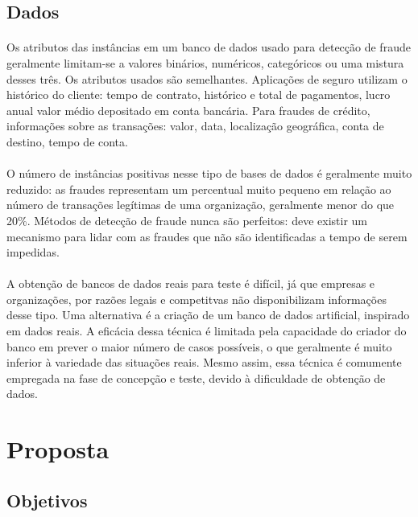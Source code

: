 \documentclass{iiufrgs}
\begin{document}
\subsection{Dados}

\paragraph{}Os atributos das instâncias em um banco de dados usado para detecção de fraude geralmente limitam-se a valores binários, numéricos, categóricos ou uma mistura desses três. Os atributos usados são semelhantes. Aplicações de seguro utilizam o histórico do cliente: tempo de contrato, histórico e total de pagamentos, lucro anual valor médio depositado em conta bancária. Para fraudes de crédito, informações sobre as transações: valor, data, localização geográfica, conta de destino, tempo de conta.

\paragraph{}O número de instâncias positivas nesse tipo de bases de dados é geralmente muito reduzido: as fraudes representam um percentual muito pequeno em relação ao número de transações legítimas de uma organização, geralmente menor do que 20\%. Métodos de detecção de fraude nunca são perfeitos: deve existir um mecanismo para lidar com as fraudes que não são identificadas a tempo de serem impedidas.

\paragraph{}A obtenção de bancos de dados reais para teste é difícil, já que empresas e organizações, por razões legais e competitvas não disponibilizam informações desse tipo. Uma alternativa é a criação de um banco de dados artificial, inspirado em dados reais. A eficácia dessa técnica é limitada pela capacidade do criador do banco em prever o maior número de casos possíveis, o que geralmente é muito inferior à variedade das situações reais. Mesmo assim, essa técnica é comumente empregada na fase de concepção e teste, devido à dificuldade de obtenção de dados.

\newpage

\section{Proposta}
\subsection{Objetivos}
\end{document}
